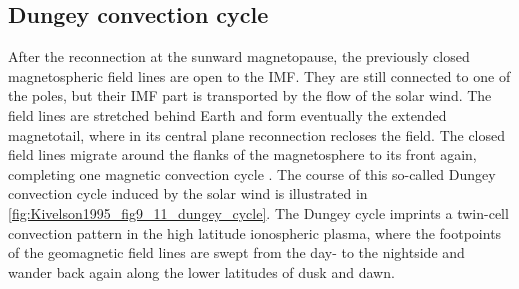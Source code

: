 \subsection{Dungey convection cycle}
\label{sec:dungey_convection_cycle}
After the reconnection at the sunward magnetopause, the previously closed magnetospheric field lines are open to the IMF. They are still connected to one of the poles, but their IMF part is transported by the flow of the solar wind. The field lines are stretched behind Earth and form eventually the extended magnetotail, where in its central plane reconnection recloses the field. The closed field lines migrate around the flanks of the magnetosphere to its front again, completing one magnetic convection cycle \citep{Dungey1961,Dungey1963}. The course of this so-called Dungey convection cycle induced by the solar wind is illustrated in \autoref{fig:Kivelson1995_fig9_11_dungey_cycle}. The Dungey cycle imprints a twin-cell convection pattern in the high latitude ionospheric plasma, where the footpoints of the geomagnetic field lines are swept from the day- to the nightside and wander back again along the lower latitudes of dusk and dawn.
\begin{figure}[htb]
\end{figure}

